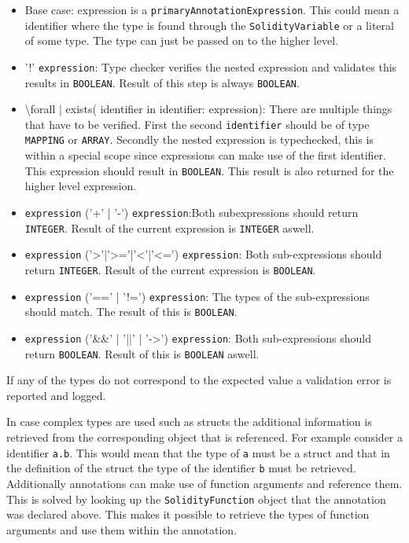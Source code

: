 \documentclass[a4paper]{article}
\begin{document}
\begin{itemize}
  \item Base case: expression is a \texttt{primaryAnnotationExpression}. This could mean a identifier where the type is found through the \texttt{SolidityVariable} or a literal of some type. The type can just be passed on to the higher level.
  \item '!' \texttt{expression}: Type checker verifies the nested expression and validates this results in \texttt{BOOLEAN}. Result of this step is always \texttt{BOOLEAN}.
  \item \textbackslash forall | exists( identifier  in identifier: expression): There are multiple things that have to be verified. First the second \texttt{identifier} should be of type \texttt{MAPPING} or \texttt{ARRAY}. Secondly the nested expression is typechecked, this is within a special scope since expressions can make use of the first identifier. This expression should result in \texttt{BOOLEAN}. This result is also returned for the higher level expression.
  \item \texttt{expression} ('+' | '-') \texttt{expression}:Both subexpressions should return \texttt{INTEGER}. Result of the current expression is \texttt{INTEGER} aswell.
  \item \texttt{expression} ('>'|'>='|'<'|'<=') \texttt{expression}: Both sub-expressions should return \texttt{INTEGER}. Result of the current expression is \texttt{BOOLEAN}.
  \item \texttt{expression} ('==' | '!=') \texttt{expression}: The types of the sub-expressions should match. The result of this is \texttt{BOOLEAN}.
  \item \texttt{expression} ('\&\&' | '||' | '->') \texttt{expression}: Both sub-expressions should return \texttt{BOOLEAN}. Result of this is \texttt{BOOLEAN} aswell.
\end{itemize}
If any of the types do not correspond to the expected value a validation error is reported and logged. \par
In case complex types are used such as structs the additional information is retrieved from the corresponding object that is referenced. For example consider a identifier \texttt{a.b}. This would mean that the type of \texttt{a} must be a struct and that in the definition of the struct the type of the identifier \texttt{b} must be retrieved. Additionally annotations can make use of function arguments and reference them. This is solved by looking up the \texttt{SolidityFunction} object that the annotation was declared above. This makes it possible to retrieve the types of function arguments and use them within the annotation.
\end{document}
